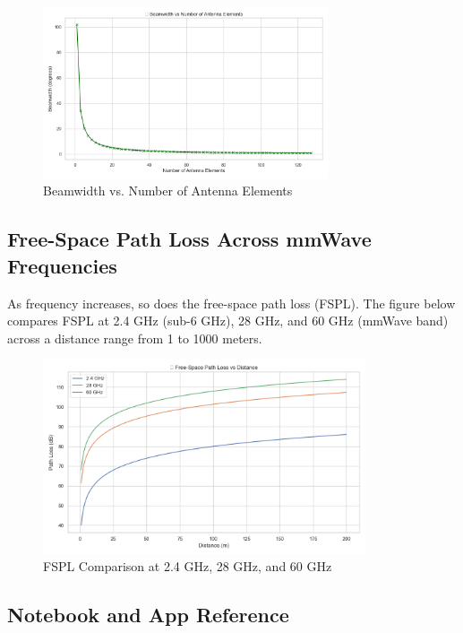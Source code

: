 \begin{figure}[h]
    \centering
    \includegraphics[width=0.75\textwidth]{figures/beamwidth_vs_elements.png}
    \caption{Beamwidth vs. Number of Antenna Elements}
    \label{fig:beamwidth_vs_elements}
\end{figure}

\subsection{Free-Space Path Loss Across mmWave Frequencies}

As frequency increases, so does the free-space path loss (FSPL). The figure below compares FSPL at 2.4 GHz (sub-6 GHz), 28 GHz, and 60 GHz (mmWave band) across a distance range from 1 to 1000 meters.

\begin{figure}[h]
    \centering
    \includegraphics[width=0.85\textwidth]{figures/mmwave_fspl_comparison.png}
    \caption{FSPL Comparison at 2.4 GHz, 28 GHz, and 60 GHz}
    \label{fig:mmwave_fspl}
\end{figure}

\subsection{Notebook and App Reference}

